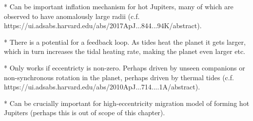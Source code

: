  * Can be important inflation mechanism for hot Jupiters, many of which are
 observed to have anomalously large radii (c.f.
 https://ui.adsabs.harvard.edu/abs/2017ApJ...844...94K/abstract).

 * There is a potential for a feedback loop. As tides heat the planet it gets
 larger, which in turn increases the tidal heating rate, making the planet even
 larger etc.

 * Only works if eccentricty is non-zero. Perhaps driven by unseen companions or
 non-synchronous rotation in the planet, perhaps driven by thermal tides (c.f.
 https://ui.adsabs.harvard.edu/abs/2010ApJ...714....1A/abstract).

 * Can be crucially important for high-eccentricity migration model of forming
 hot Jupiters (perhaps this is out of scope of this chapter).
